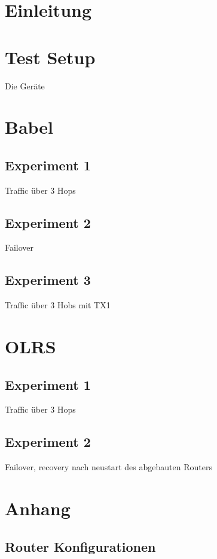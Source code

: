 \documentclass[10pt]{scrartcl}
\author{André Harms, Oliver Steenbuck}
\title{\titletext}
\date{09.11.2011}
\begin{document}
\maketitle

\setcounter{tocdepth}{3}
\tableofcontents

	\listoftables                                 												%
	\listoffigures   

\section{Einleitung}

\section{Test Setup}
	Die Geräte 

\section{Babel}
	\subsection{Experiment 1}
	Traffic über 3 Hops	
	
	\subsection{Experiment 2}
	Failover	
	
	\subsection{Experiment 3}
	Traffic über 3 Hobs mit TX1


\section{OLRS}
	\subsection{Experiment 1}
	Traffic über 3 Hops	
	
	\subsection{Experiment 2}
	Failover, recovery nach neustart des abgebauten Routers


\section{Anhang}
	\subsection{Router Konfigurationen}
	
\end{document}
